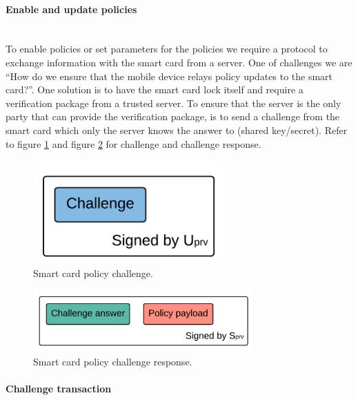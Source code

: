 \paragraph{Enable and update policies}\mbox{}\\
To enable policies or set parameters for the policies we require a protocol to exchange information with the smart card from a server. One of challenges we are ``How do we ensure that the mobile device relays policy updates to the smart card?''. One solution is to have the smart card lock itself and require a verification package from a trusted server. To ensure that the server is the only party that can provide the verification package, is to send a challenge from the smart card which only the server knows the answer to (shared key/secret). Refer to figure \ref{fig:OH} and figure \ref{fig:NH} for challenge and challenge response.

\begin{figure}[h!]
  \caption{Smart card policy challenge.}
  \label{fig:OH}
  \centering
    \includegraphics[width=0.65\textwidth]{images/challenge.png}
\end{figure}

\begin{figure}[h!]
  \caption{Smart card policy challenge response.}
  \label{fig:NH}
  \centering
    \includegraphics[width=0.75\textwidth]{images/challenge_response.png}
\end{figure}

\newpage

\paragraph{Challenge transaction}\mbox{}\\

